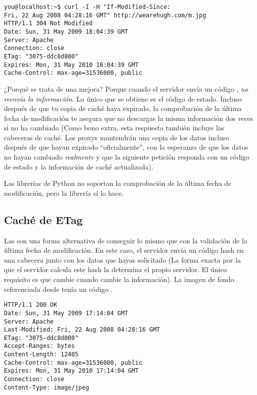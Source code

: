 \noindent\begin{minipage}{\textwidth}
\begin{lstlisting}[mathescape=False]
you@localhost:~$ curl -I -H "If-Modified-Since: 
Fri, 22 Aug 2008 04:28:16 GMT" http://wearehugh.com/m.jpg
HTTP/1.1 304 Not Modified
Date: Sun, 31 May 2009 18:04:39 GMT
Server: Apache
Connection: close
ETag: "3075-ddc8d800"
Expires: Mon, 31 May 2010 18:04:39 GMT
Cache-Control: max-age=31536000, public
\end{lstlisting}
\end{minipage}

¿Porqué se trata de una mejora? Porque cuando el servidor envía un código , \emph{no reenvía la información}. Lo único que se obtiene es el código de estado. Incluso después de que tu copia de caché haya expirado, la comprobación de la última fecha de modificación te asegura que no descargas la misma información dos veces si no ha cambiado (Como bono extra, esta respuesta  también incluye las cabeceras de caché. Los proxys mantendrán una copia de los datos incluso después de que hayan expirado ``oficialmente'', con la esperanza de que los datos no hayan cambiado \emph{realmente} y que la siguiente petición responda con un código de estado  y la información de caché actualizada).

Las librerías  de Python no soportan la comprobación de la última fecha de modificación, pero la librería  sí lo hace.

\subsection{Caché de ETag}

Las  son una forma alternativa de conseguir lo mismo que con la validación de la última fecha de modificación. En este caso, el servidor envía un código hash en una cabecera  junto con los datos que hayas solicitado (La forma exacta por la que el servidor calcula este hash la determina el propio servidor. El único requisito es que cambie cuando cambie la información). La imagen de fondo referenciada desde  tenía un código .

\noindent\begin{minipage}{\textwidth}
\begin{lstlisting}[mathescape=True]
HTTP/1.1 200 OK
Date: Sun, 31 May 2009 17:14:04 GMT
Server: Apache
Last-Modified: Fri, 22 Aug 2008 04:28:16 GMT
ETag: "3075-ddc8d800"
Accept-Ranges: bytes
Content-Length: 12405
Cache-Control: max-age=31536000, public
Expires: Mon, 31 May 2010 17:14:04 GMT
Connection: close
Content-Type: image/jpeg
\end{lstlisting}
\end{minipage}

